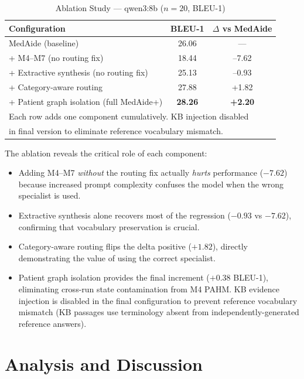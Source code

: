 \documentclass[conference]{IEEEtran}
\begin{document}
\begin{table}[t]
\centering
\caption{Ablation Study — qwen3:8b ($n{=}20$, BLEU-1)}
\label{tab:ablation}
\setlength{\tabcolsep}{5pt}
\begin{tabular}{lcc}
\toprule
\textbf{Configuration} & \textbf{BLEU-1} & \textbf{$\Delta$ vs MedAide} \\
\midrule
MedAide (baseline)                        & 26.06 & — \\
+ M4–M7 (no routing fix)                  & 18.44 & --7.62 \\
+ Extractive synthesis (no routing fix)   & 25.13 & --0.93 \\
+ Category-aware routing                  & 27.88 & +1.82 \\
+ Patient graph isolation (full MedAide+) & \textbf{28.26} & \textbf{+2.20} \\
\bottomrule
\multicolumn{3}{l}{\scriptsize Each row adds one component cumulatively. KB injection disabled}\\
\multicolumn{3}{l}{\scriptsize in final version to eliminate reference vocabulary mismatch.}\\
\end{tabular}
\end{table}

The ablation reveals the critical role of each component:
\begin{itemize}
  \item Adding M4–M7 \emph{without} the routing fix actually \emph{hurts} performance
    ($-7.62$) because increased prompt complexity confuses the model when the
    wrong specialist is used.
  \item Extractive synthesis alone recovers most of the regression ($-0.93$ vs $-7.62$),
    confirming that vocabulary preservation is crucial.
  \item Category-aware routing flips the delta positive ($+1.82$), directly
    demonstrating the value of using the correct specialist.
  \item Patient graph isolation provides the final increment ($+0.38$ BLEU-1),
    eliminating cross-run state contamination from M4 PAHM. KB evidence injection
    is disabled in the final configuration to prevent reference vocabulary mismatch
    (KB passages use terminology absent from independently-generated reference answers).
\end{itemize}

\section{Analysis and Discussion}
\label{sec:analysis}
\end{document}
